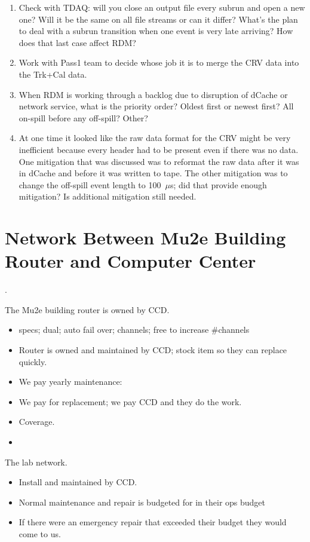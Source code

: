\begin{enumerate}
\item Check with TDAQ: will you close an output file every subrun and open a new one? Will it be the same
  on all file streams or can it differ?  What's the plan to deal with a subrun transition when one
  event is very late arriving?  How does that last case affect RDM?
\item Work with Pass1 team to decide whose job it is to merge the CRV data into the Trk+Cal data.
\item When RDM is working through a backlog due to disruption of dCache or network service, what is the priority
  order?  Oldest first or newest first?  All on-spill before any off-spill?  Other?
\item At one time it looked like the raw data format for the CRV might be very inefficient
  because every header had to be present even if there was no data.
  One mitigation that was discussed was to reformat the raw data after it was in dCache and before it was written to tape.
  The other mitigation was to change the off-spill event length to 100~$\mu$s; did that provide enough mitigation?
  Is additional mitigation still needed.
\end{enumerate}


\appendix

\chapter{Network Between Mu2e Building Router and Computer Center}
\label{app:RouterAndNetwork}.

The Mu2e building router is owned by CCD.
\begin{itemize}
\item specs; dual; auto fail over; channels; free to increase \#channels
\item Router is owned and maintained by CCD; stock item so they can replace quickly.
\item We pay yearly maintenance: 
\item We pay for replacement; we pay CCD and they do the work. 
\item {} Coverage.
\item {}
\end{itemize}


The lab network.
\begin{itemize}
\item Install and maintained by CCD.
\item Normal maintenance and repair is budgeted for in their ops budget
\item If there were an emergency repair that exceeded their budget they would come to us. 
\end{itemize}


